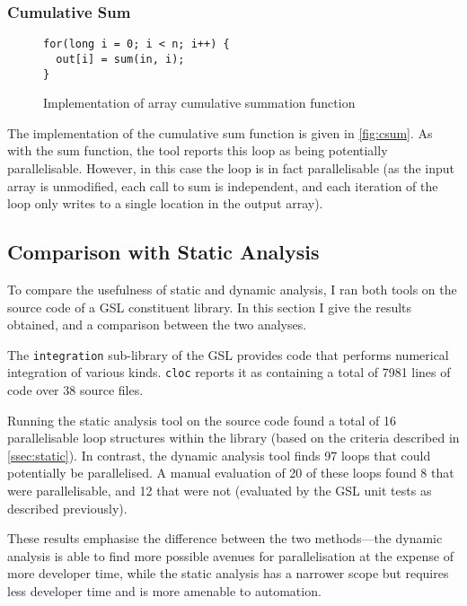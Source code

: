 \documentclass[journal]{IEEEtran}
\begin{document}
\subsubsection{Cumulative Sum}

\begin{figure}[h]
  \centering
  \begin{lstlisting}
for(long i = 0; i < n; i++) {
  out[i] = sum(in, i);
}
  \end{lstlisting}
  \caption{Implementation of array cumulative summation function}
  \label{fig:csum}
\end{figure}

The implementation of the cumulative sum function is given in
\autoref{fig:csum}. As with the sum function, the tool reports this loop as
being potentially parallelisable. However, in this case the loop is in fact
parallelisable (as the input array is unmodified, each call to sum is
independent, and each iteration of the loop only writes to a single location in
the output array).

\subsection{Comparison with Static Analysis} \label{ssec:compare}

To compare the usefulness of static and dynamic analysis, I ran both tools on
the source code of a GSL constituent library. In this section I give the results
obtained, and a comparison between the two analyses.

The \texttt{integration} sub-library of the GSL provides code that performs
numerical integration of various kinds. \texttt{cloc} reports it as containing a
total of 7981 lines of code over 38 source files.

Running the static analysis tool on the source code found a total of 16
parallelisable loop structures within the library (based on the criteria
described in \autoref{ssec:static}). In contrast, the dynamic analysis tool
finds 97 loops that could potentially be parallelised. A manual evaluation of 20
of these loops found 8 that were parallelisable, and 12 that were not (evaluated
by the GSL unit tests as described previously).

These results emphasise the difference between the two methods---the dynamic
analysis is able to find more possible avenues for parallelisation at the
expense of more developer time, while the static analysis has a narrower scope
but requires less developer time and is more amenable to automation.
\end{document}
